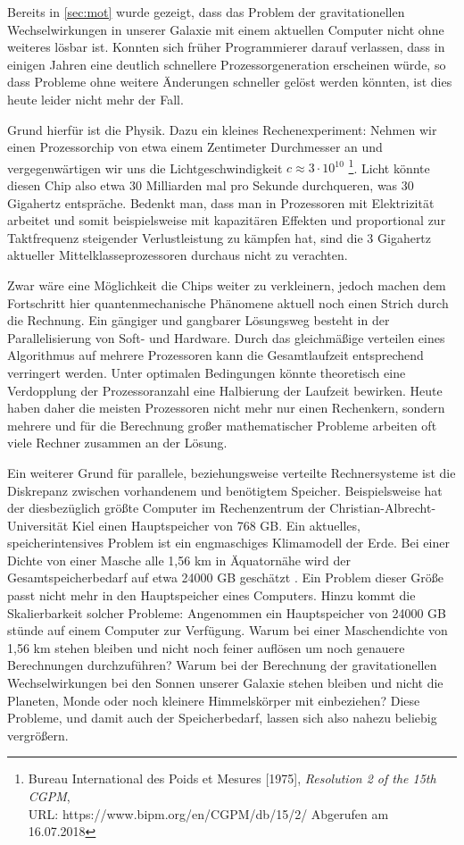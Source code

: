 Bereits in \autoref{sec:mot} wurde gezeigt, dass das Problem der gravitationellen Wechselwirkungen in unserer Galaxie mit einem aktuellen Computer nicht ohne 
    weiteres lösbar ist. 
    Konnten sich früher Programmierer darauf verlassen, dass in einigen Jahren eine deutlich schnellere Prozessorgeneration erscheinen würde, so dass Probleme ohne 
    weitere Änderungen schneller gelöst werden könnten, ist dies heute leider nicht mehr der Fall. 
    
    Grund hierfür ist die Physik. Dazu ein kleines Rechenexperiment: Nehmen wir einen Prozessorchip von etwa einem Zentimeter Durchmesser an und vergegenwärtigen wir 
    uns die Lichtgeschwindigkeit $c \approx 3\cdot10^{10}$ \footnote{Bureau International des Poids et Mesures [1975], \textit{Resolution 2 of the 15th CGPM},\\URL:
    https://www.bipm.org/en/CGPM/db/15/2/ Abgerufen am 16.07.2018}. Licht könnte diesen Chip also etwa 30 Milliarden mal pro Sekunde durchqueren, was 30 Gigahertz
    entspräche. Bedenkt man, dass man in Prozessoren mit Elektrizität arbeitet und somit beispielsweise mit kapazitären Effekten und proportional zur Taktfrequenz steigender
    Verlustleistung zu kämpfen hat, sind die 3 Gigahertz aktueller Mittelklasseprozessoren durchaus nicht zu verachten.
    
    Zwar wäre eine Möglichkeit die Chips weiter zu verkleinern, jedoch machen dem Fortschritt hier quantenmechanische Phänomene aktuell noch einen Strich durch die Rechnung.
    Ein gängiger und gangbarer Lösungsweg besteht in der Parallelisierung von Soft- und Hardware. Durch das gleichmäßige verteilen eines Algorithmus auf mehrere Prozessoren
    kann die Gesamtlaufzeit entsprechend verringert werden. Unter optimalen Bedingungen könnte theoretisch eine Verdopplung der Prozessoranzahl eine Halbierung der Laufzeit
    bewirken. Heute haben daher die meisten Prozessoren nicht mehr nur einen Rechenkern, sondern mehrere und für die Berechnung großer mathematischer Probleme arbeiten oft viele
    Rechner zusammen an der Lösung. \citep{hpcskript}
    
    Ein weiterer Grund für parallele, beziehungsweise verteilte Rechnersysteme ist die Diskrepanz zwischen vorhandenem und benötigtem Speicher. Beispielsweise hat der diesbezüglich größte
    Computer im Rechenzentrum der Christian-Albrecht-Universität Kiel einen Hauptspeicher von 768 GB. Ein aktuelles, speicherintensives Problem ist ein engmaschiges 
    Klimamodell der Erde. Bei einer Dichte von einer Masche alle 1,56 km in Äquatornähe wird der Gesamtspeicherbedarf auf etwa 24000 GB geschätzt \citep{climate}. Ein Problem
    dieser Größe passt nicht mehr in den Hauptspeicher eines Computers.
    Hinzu kommt die Skalierbarkeit solcher Probleme: Angenommen ein Hauptspeicher von 24000 GB stünde auf einem Computer zur Verfügung. Warum bei einer Maschendichte von 
    1,56 km stehen bleiben und nicht noch feiner auflösen um noch genauere Berechnungen durchzuführen?
    Warum bei der Berechnung der gravitationellen Wechselwirkungen bei den Sonnen unserer Galaxie stehen bleiben und nicht die Planeten, Monde oder noch kleinere Himmelskörper mit einbeziehen? 
    Diese Probleme, und damit auch der Speicherbedarf, lassen sich also nahezu beliebig vergrößern.
    

